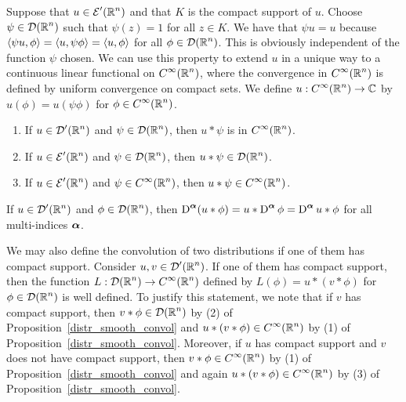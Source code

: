 Suppose that $\displaystyle u \in \mathcal{E}'(\mathbb{R}^n)$ and that $K$ is the
compact support of $u$.  Choose $\displaystyle \psi \in \mathcal{D}(\mathbb{R}^n)$
such that $\psi(z) =1$ for all $z \in K$.  We have that $\psi u = u$ because
$\left\langle{\psi u} , {\phi}\right\rangle = \left\langle{u} , {\psi \phi}\right\rangle = \left\langle{u} , {\phi}\right\rangle$ for all
$\displaystyle \phi \in \mathcal{D}(\mathbb{R}^n)$.  This is obviously independent of
the function $\psi$ chosen.  We can use this property to extend $u$ in a
unique way to a continuous linear functional on
$\displaystyle C^\infty(\mathbb{R}^n)$,
where the convergence in $\displaystyle C^\infty(\mathbb{R}^n)$ is defined by uniform
convergence on compact sets.  We define
$\displaystyle u:C^\infty(\mathbb{R}^n) \to \mathbb{C}$ by
$u(\phi) = u(\psi \phi)$ for $\displaystyle \phi \in C^\infty(\mathbb{R}^n)$.

\begin{prop} \label{distr_smooth_convol}
\begin{enumerate}
\item If $\displaystyle u\in \mathcal{D}'(\mathbb{R}^n)$ and
$\displaystyle \psi\in \mathcal{D}(\mathbb{R}^n)$, then $u\ast \psi$
is in $\displaystyle C^\infty(\mathbb{R}^n)$.
\item If $\displaystyle u\in \mathcal{E}'(\mathbb{R}^n)$ and
$\displaystyle \psi\in \mathcal{D}(\mathbb{R}^n)$, then
$\displaystyle u \ast \psi \in \mathcal{D}(\mathbb{R}^n)$.
\item If $\displaystyle u\in \mathcal{E}'(\mathbb{R}^n)$ and
$\displaystyle \psi\in C^\infty(\mathbb{R}^n)$, then
$\displaystyle u \ast \psi \in C^\infty(\mathbb{R}^n)$.
\end{enumerate}
\end{prop}

\begin{prop} \label{distr_comm_der}
If $\displaystyle u\in \mathcal{D}'(\mathbb{R}^n)$ and
$\displaystyle \phi\in \mathcal{D}(\mathbb{R}^n)$, then
$\displaystyle \operatorname{D}^{{\bm{\alpha}}}(u\ast \phi)
= u \ast \operatorname{D}^{{\bm{\alpha}}} \phi = \operatorname{D}^{{\bm{\alpha}}} u \ast \phi$
for all multi-indices ${\bm{\alpha}}$.
\end{prop}

We may also define the convolution of two distributions if one of them
has compact support.  Consider $\displaystyle u,v \in \mathcal{D}'(\mathbb{R}^n)$.
If one of them has compact support, then the function
$\displaystyle L: \mathcal{D}(\mathbb{R}^n) \to C^\infty(\mathbb{R}^n)$
defined by $\displaystyle L(\phi) = u \ast (v \ast \phi)$ for
$\displaystyle \phi \in \mathcal{D}(\mathbb{R}^n)$ is well defined.  To justify this
statement, we note that if $v$ has compact support, then
$\displaystyle v \ast \phi \in \mathcal{D}(\mathbb{R}^n)$
by (2) of Proposition~\ref{distr_smooth_convol} and
$\displaystyle u \ast (v \ast \phi) \in C^\infty(\mathbb{R}^n)$ by (1) of
Proposition~\ref{distr_smooth_convol}.  Moreover, if $u$ has compact
support and $v$ does not have compact support, then
$\displaystyle v \ast \phi \in C^\infty(\mathbb{R}^n)$ by (1) of
Proposition~\ref{distr_smooth_convol} and again 
$\displaystyle u \ast (v \ast \phi) \in C^\infty(\mathbb{R}^n)$ by (3) of
Proposition~\ref{distr_smooth_convol}.

